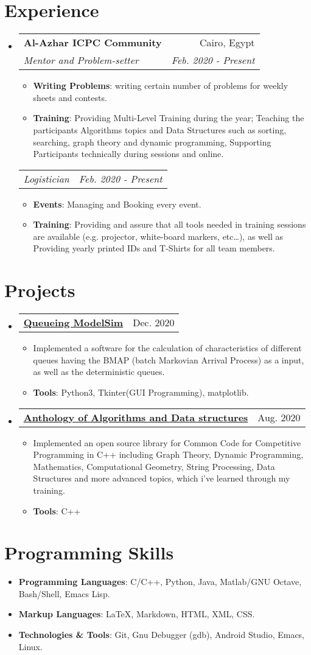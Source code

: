 \documentclass[letterpaper, 11pt]{article}
\makeatletter
\newcommand{\Item}[2]{\item\small{\textbf{#1}{#2 \vspace{-2pt}}}}
\newcommand{\SubSecListBeg}{\begin{itemize}[leftmargin=*]}
\newcommand{\SubSecListEnd}{\end{itemize}}
\newcommand{\ItemListBeg}{\begin{itemize}}
\newcommand{\ItemListEnd}{\end{itemize}\vspace{-5pt}}
\newcommand{\SubSecExperience}[4] {
	\vspace{-1pt}\item
	\begin{tabular*}{0.97\textwidth}[t]{l@{\extracolsep{\fill}}r}
		\textbf{#1} & #2 \\
		\textit{\small#3} & \textit{\small #4} \\
	\end{tabular*}\vspace{-5pt}
}
\newcommand{\SubSecProject}[2] {
	\vspace{-1pt}\item
	\begin{tabular*}{0.97\textwidth}[t]{l@{\extracolsep{\fill}}r}
		\textbf{#1} & #2 \\
	\end{tabular*}\vspace{-5pt}
}
\newcommand{\SubSubSecExperience}[2] {
	\begin{tabular*}{0.97\textwidth}{l@{\extracolsep{\fill}}r}
		\textit{\small#1} & \textit{\small #2} \\
	\end{tabular*}\vspace{-5pt}
}
\makeatother
\begin{document}
\section{Experience}
\SubSecListBeg
	\SubSecExperience
	{Al-Azhar ICPC Community}{Cairo, Egypt}
	{Mentor and Problem-setter}{Feb. 2020 - Present}
      	\ItemListBeg
        	\Item{Writing Problems}
        	{: writing certain number of problems for weekly sheets and contests.}
		\Item{Training}
		{: Providing Multi-Level Training during the year; Teaching the participants Algorithms topics and Data Structures such as sorting, searching, graph theory and dynamic programming, Supporting Participants technically during sessions and online.}
      	\ItemListEnd
	\SubSubSecExperience
	{Logistician}{Feb. 2020 - Present}
	\ItemListBeg
        	\Item{Events}
        	{: Managing and Booking every event.}
        	\Item{Training}
          	{: Providing and assure that all tools needed in training sessions are available (e.g. projector, white-board markers, etc…), as well as Providing yearly printed IDs and T-Shirts for all team members.}
      	\ItemListEnd
\SubSecListEnd


\section{Projects}
\SubSecListBeg
	\SubSecProject
	{\faIcon{user-clock} \href{https://github.com/AbdeltwabMF/Queueing-ModelSim}{Queueing ModelSim}}{Dec. 2020}
	\ItemListBeg
		\Item{}
		{Implemented a software for the calculation of characteristics of different queues having the BMAP (batch Markovian Arrival Process) as a input, as well as the deterministic queues.}
		\Item{Tools}
		{: Python3, Tkinter(GUI Programming), matplotlib.}
	\ItemListEnd

	\SubSecProject
	{\faIcon{laptop-code} \href{https://github.com/AbdeltwabMF/Anthology-of-Algorithms-and-Data-structures}{Anthology of Algorithms and Data structures}}{Aug. 2020}
	\ItemListBeg
		\Item{}
		{Implemented an open source library for Common Code for Competitive Programming in C++ including Graph Theory, Dynamic Programming, Mathematics, Computational Geometry, String Processing, Data Structures and more advanced topics, which i've learned through my training.}
		\Item{Tools}
		{: C++}
	\ItemListEnd
\SubSecListEnd

\section{Programming Skills}
\SubSecListBeg
	\Item{Programming Languages}
	{: C/C++, Python, Java, Matlab/GNU Octave, Bash/Shell, Emacs Lisp.}
	\Item{Markup Languages}
	{: \LaTeX, Markdown, HTML, XML, CSS.}
	\Item{Technologies \& Tools}
	{: Git, Gnu Debugger (gdb), Android Studio, Emacs, Linux.}
\SubSecListEnd
\end{document}
